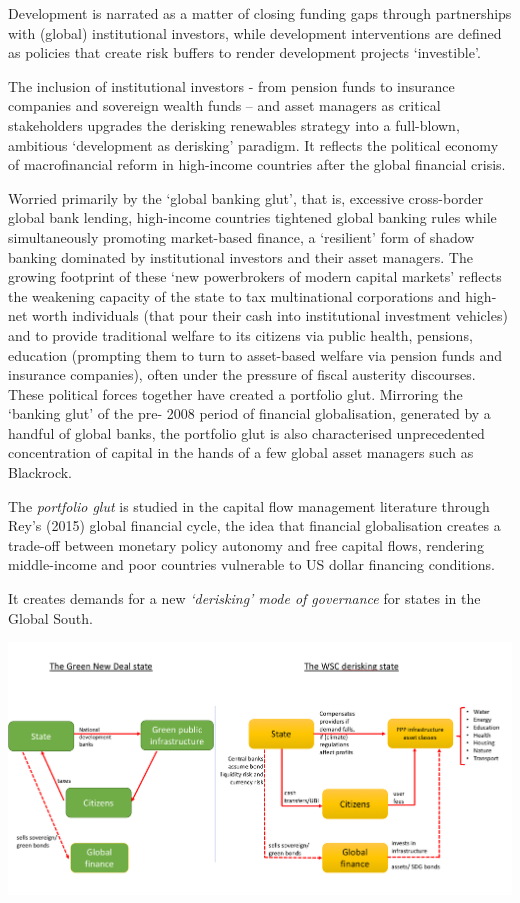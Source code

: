 \documentclass[
]{book}
\begin{document}
Development is narrated as a matter of closing funding gaps
through partnerships with (global) institutional investors,
while development interventions are defined as policies that
create risk buffers to render development projects `investible'.

The inclusion of institutional investors - from pension funds to insurance companies
and sovereign wealth funds -- and asset managers as critical stakeholders upgrades the
derisking renewables strategy into a full-blown, ambitious `development as derisking'
paradigm.
It reflects the political economy of macrofinancial reform in high-income countries
after the global financial crisis.

Worried primarily
by the `global banking glut', that is, excessive cross-border global bank
lending, high-income countries tightened global banking rules while simultaneously
promoting market-based finance, a `resilient' form of shadow banking dominated by
institutional investors and their asset managers. The growing footprint of these `new
powerbrokers of modern capital markets'
reflects the weakening capacity of the state to tax multinational corporations and high-
net worth individuals (that pour their cash into institutional investment vehicles) and to
provide traditional welfare to its citizens via public health, pensions, education
(prompting them to turn to asset-based welfare via pension funds and insurance
companies), often under the pressure of fiscal austerity discourses. These political
forces together have created a portfolio glut. Mirroring the `banking glut' of the pre-
2008 period of financial globalisation, generated by a handful of global banks, the
portfolio glut is also characterised unprecedented concentration of capital in the hands
of a few global asset managers such as Blackrock.

The \emph{portfolio glut} is studied in the capital flow management literature
through Rey's (2015) global financial cycle, the idea that
financial globalisation creates a trade-off between monetary policy autonomy and free
capital flows, rendering middle-income and poor countries vulnerable to US dollar
financing conditions.

It creates demands for a new \emph{`derisking' mode of governance} for states in the Global South.

\includegraphics{fig/WSC_State.png}
\end{document}
